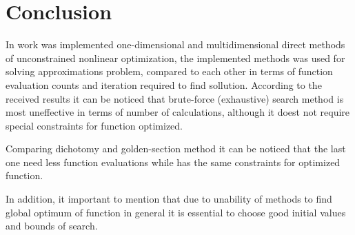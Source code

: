\section*{Conclusion}

In work was implemented one-dimensional and multidimensional direct methods of unconstrained nonlinear optimization, the implemented methods was 
used for solving approximations problem, compared to each other in terms of function evaluation counts and iteration required to find sollution.
According to the received results it can be noticed that brute-force (exhaustive) search method is most uneffective in terms of number of calculations, 
although it doest not require special constraints for function optimized.

Comparing dichotomy and golden-section method it can be noticed that the last one need less function evaluations while has the same constraints for optimized function.

In addition, it important to mention that due to unability of methods to find global optimum of function in general it is essential to choose good initial values and bounds of search.